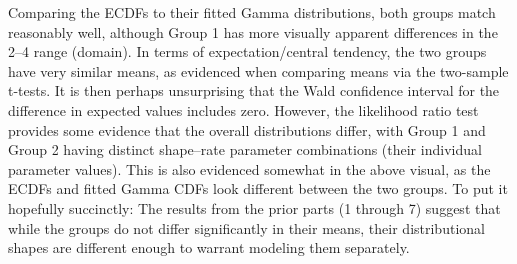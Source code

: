 \documentclass[
]{article}
\begin{document}
Comparing the ECDFs to their fitted Gamma distributions, both groups
match reasonably well, although Group 1 has more visually apparent
differences in the 2--4 range (domain). In terms of expectation/central
tendency, the two groups have very similar means, as evidenced when
comparing means via the two-sample t-tests. It is then perhaps
unsurprising that the Wald confidence interval for the difference in
expected values includes zero. However, the likelihood ratio test
provides some evidence that the overall distributions differ, with Group
1 and Group 2 having distinct shape--rate parameter combinations (their
individual parameter values). This is also evidenced somewhat in the
above visual, as the ECDFs and fitted Gamma CDFs look different between
the two groups. To put it hopefully succinctly: The results from the
prior parts (1 through 7) suggest that while the groups do not differ
significantly in their means, their distributional shapes are different
enough to warrant modeling them separately.
\end{document}
